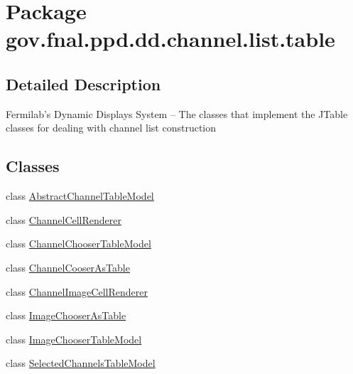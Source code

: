 \hypertarget{namespacegov_1_1fnal_1_1ppd_1_1dd_1_1channel_1_1list_1_1table}{\section{Package gov.\-fnal.\-ppd.\-dd.\-channel.\-list.\-table}
\label{namespacegov_1_1fnal_1_1ppd_1_1dd_1_1channel_1_1list_1_1table}
}


\subsection{Detailed Description}
Fermilab's Dynamic Displays System -- The classes that implement the J\-Table classes for dealing with channel list construction\subsection*{Classes}
\begin{DoxyCompactItemize}
\item 
class \hyperlink{classgov_1_1fnal_1_1ppd_1_1dd_1_1channel_1_1list_1_1table_1_1AbstractChannelTableModel}{Abstract\-Channel\-Table\-Model}
\item 
class \hyperlink{classgov_1_1fnal_1_1ppd_1_1dd_1_1channel_1_1list_1_1table_1_1ChannelCellRenderer}{Channel\-Cell\-Renderer}
\item 
class \hyperlink{classgov_1_1fnal_1_1ppd_1_1dd_1_1channel_1_1list_1_1table_1_1ChannelChooserTableModel}{Channel\-Chooser\-Table\-Model}
\item 
class \hyperlink{classgov_1_1fnal_1_1ppd_1_1dd_1_1channel_1_1list_1_1table_1_1ChannelCooserAsTable}{Channel\-Cooser\-As\-Table}
\item 
class \hyperlink{classgov_1_1fnal_1_1ppd_1_1dd_1_1channel_1_1list_1_1table_1_1ChannelImageCellRenderer}{Channel\-Image\-Cell\-Renderer}
\item 
class \hyperlink{classgov_1_1fnal_1_1ppd_1_1dd_1_1channel_1_1list_1_1table_1_1ImageChooserAsTable}{Image\-Chooser\-As\-Table}
\item 
class \hyperlink{classgov_1_1fnal_1_1ppd_1_1dd_1_1channel_1_1list_1_1table_1_1ImageChooserTableModel}{Image\-Chooser\-Table\-Model}
\item 
class \hyperlink{classgov_1_1fnal_1_1ppd_1_1dd_1_1channel_1_1list_1_1table_1_1SelectedChannelsTableModel}{Selected\-Channels\-Table\-Model}
\end{DoxyCompactItemize}
